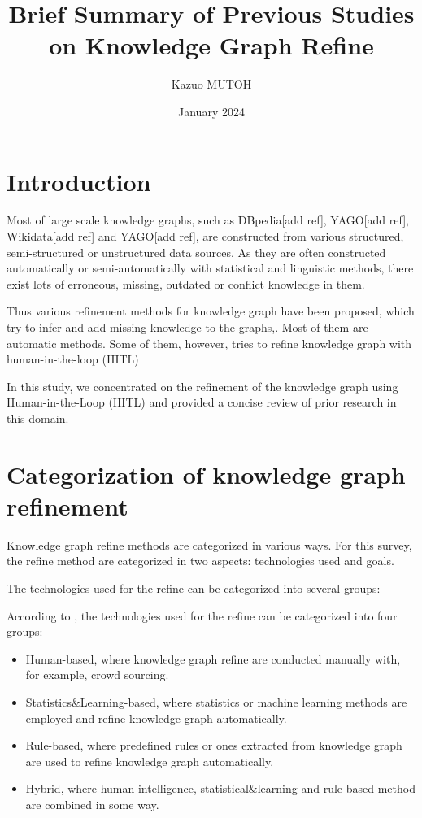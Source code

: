 \documentclass{article}
\title{Brief Summary of Previous Studies \\ on Knowledge Graph Refine}
\author{Kazuo MUTOH}
\date{January 2024}
\begin{document}
\maketitle

\newpage

\section{Introduction}

Most of large scale knowledge graphs, such as DBpedia[add ref], 
YAGO[add ref], Wikidata[add ref] and YAGO[add ref],  are 
constructed from  various structured, semi-structured or unstructured 
data sources. As they are often constructed automatically or 
semi-automatically with statistical and linguistic methods, 
there exist lots of erroneous, missing, outdated or conflict 
knowledge in them.

Thus various refinement methods for knowledge graph have been proposed, 
which try to infer and add missing knowledge to the graphs\cite{paulheim_knowledge_2017},\cite{xue_knowledge_2022}. 
Most of them are automatic methods. Some of them, however,
tries to refine knowledge graph with human-in-the-loop (HITL)

In this study, we concentrated on the refinement of the knowledge graph 
using Human-in-the-Loop (HITL) and provided a concise review of prior research in this domain.

\section{Categorization of knowledge graph refinement}

Knowledge graph refine methods are categorized in various ways. 
For this survey, the refine method are categorized in two aspects: 
technologies used and goals. 

The technologies used for the refine can be categorized 
into several groups\cite{xue_knowledge_2022}:

According to \cite{xue_knowledge_2022}, the technologies used for the refine can be categorized 
into four groups:

\begin{itemize}
    \item Human-based, where knowledge graph refine are conducted manually 
    with, for example, crowd sourcing. 
    \item Statistics\&Learning-based, where statistics or machine learning methods 
    are employed and refine knowledge graph automatically. 
    \item Rule-based, where predefined rules or ones extracted from knowledge graph 
    are used to refine knowledge graph automatically.
    \item Hybrid, where human intelligence, statistical\&learning and rule based 
    method are combined in some way.
\end{itemize}
\end{document}
